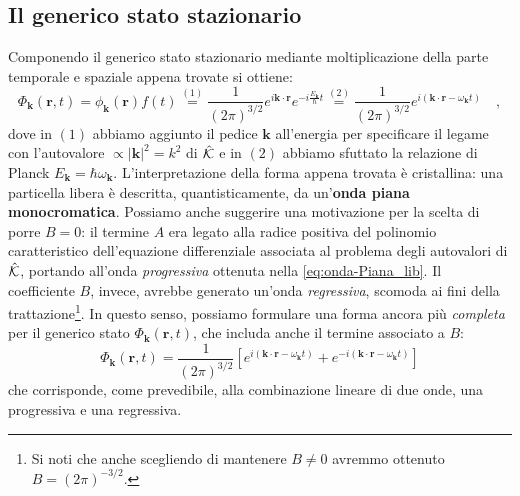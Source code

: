 \subsection{Il generico stato stazionario}
Componendo il generico stato stazionario mediante moltiplicazione della parte temporale e spaziale appena trovate si ottiene:
\begin{equation}
    \Phi_{\bm{k}}(\bm{r},t) = \phi_{\bm{k}}(\bm{r})f(t) \overset{(1)}{=} \frac{1}{(2\pi)^{3/2}} e^{i\bm{k}\cdot \bm{r}}  e^{-i\frac{E_{\bm{k}}}{\hbar}t} \overset{(2)}{=} \frac{1}{(2\pi)^{3/2}} e^{i(\bm{k} \cdot \bm{r}-\omega_{\bm{k}} t)} \quad,
    \label{eq:onda-Piana_lib}
\end{equation}
dove in $(1)$ abbiamo aggiunto il pedice $\bm{k}$ all'energia per specificare il legame con l'autovalore $\propto |\bm{k}|^2 = k^2$ di $\hat{\mathcal{K}}$ e in $(2)$ abbiamo sfuttato la relazione di Planck $E_{\bm{k}} = \hbar \omega_{\bm{k}}$. L'interpretazione della forma appena trovata è cristallina: una particella libera è descritta, quantisticamente, da un'\textbf{onda piana monocromatica}. Possiamo anche suggerire una motivazione per la scelta di porre $B = 0$: il termine $A$ era legato alla radice positiva del polinomio caratteristico dell'equazione differenziale associata al problema degli autovalori di $\hat{\mathcal{K}}$, portando all'onda \emph{progressiva} ottenuta nella \eqref{eq:onda-Piana_lib}. Il coefficiente $B$, invece, avrebbe generato un'onda \emph{regressiva}, scomoda ai fini della trattazione\footnote{Si noti che anche scegliendo di mantenere $B \neq 0$ avremmo ottenuto $B = (2\pi)^{-3/2}$.}. In questo senso, possiamo formulare una forma ancora più \emph{completa} per il generico stato $\Phi_{\bm{k}}(\bm{r},t)$, che includa anche il termine associato a $B$:
\[
    \Phi_{\bm{k}}(\bm{r},t) = \frac{1}{(2\pi)^{3/2}} \left[ e^{i(\bm{k} \cdot \bm{r}-\omega_{\bm{k}} t)} + e^{-i(\bm{k} \cdot \bm{r}-\omega_{\bm{k}} t)} \right]
\]
che corrisponde, come prevedibile, alla combinazione lineare di due onde, una progressiva e una regressiva. 

